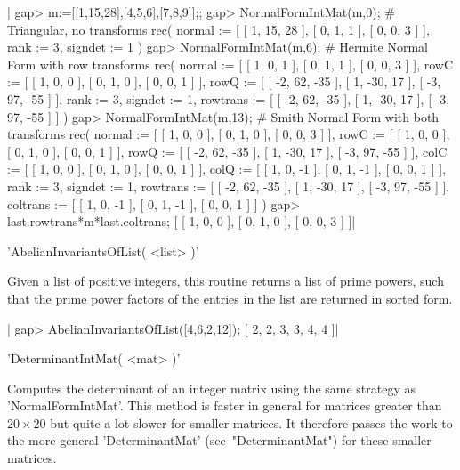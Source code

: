 |    gap> m:=[[1,15,28],[4,5,6],[7,8,9]];;
    gap> NormalFormIntMat(m,0);  # Triangular, no transforms
    rec( normal := [ [ 1, 15, 28 ], [ 0, 1, 1 ], [ 0, 0, 3 ] ], rank := 3,
      signdet := 1 )
    gap> NormalFormIntMat(m,6);  # Hermite Normal Form with row transforms
    rec( normal := [ [ 1, 0, 1 ], [ 0, 1, 1 ], [ 0, 0, 3 ] ],
      rowC := [ [ 1, 0, 0 ], [ 0, 1, 0 ], [ 0, 0, 1 ] ],
      rowQ := [ [ -2, 62, -35 ], [ 1, -30, 17 ], [ -3, 97, -55 ] ], rank := 3,
      signdet := 1,
      rowtrans := [ [ -2, 62, -35 ], [ 1, -30, 17 ], [ -3, 97, -55 ] ] )
    gap> NormalFormIntMat(m,13); # Smith Normal Form with both transforms
    rec( normal := [ [ 1, 0, 0 ], [ 0, 1, 0 ], [ 0, 0, 3 ] ],
      rowC := [ [ 1, 0, 0 ], [ 0, 1, 0 ], [ 0, 0, 1 ] ],
      rowQ := [ [ -2, 62, -35 ], [ 1, -30, 17 ], [ -3, 97, -55 ] ],
      colC := [ [ 1, 0, 0 ], [ 0, 1, 0 ], [ 0, 0, 1 ] ],
      colQ := [ [ 1, 0, -1 ], [ 0, 1, -1 ], [ 0, 0, 1 ] ], rank := 3,
      signdet := 1,
      rowtrans := [ [ -2, 62, -35 ], [ 1, -30, 17 ], [ -3, 97, -55 ] ],
      coltrans := [ [ 1, 0, -1 ], [ 0, 1, -1 ], [ 0, 0, 1 ] ] )
    gap> last.rowtrans*m*last.coltrans;
    [ [ 1, 0, 0 ], [ 0, 1, 0 ], [ 0, 0, 3 ] ]|

'AbelianInvariantsOfList( <list> )'

Given  a list of  positive integers, this  routine returns a  list of prime
powers,  such that the prime  power factors of the  entries in the list are
returned in sorted form.

|    gap> AbelianInvariantsOfList([4,6,2,12]);
    [ 2, 2, 3, 3, 4, 4 ]|


'DeterminantIntMat( <mat> )'

Computes  the determinant of  an integer matrix  using the same strategy as
'NormalFormIntMat'.  This method is faster  in general for matrices greater
than  $20  \times  20$  but  quite  a  lot  slower for smaller matrices. It
therefore   passes   the   work   to   the  more  general  'DeterminantMat'
(see~"DeterminantMat") for these smaller matrices.

